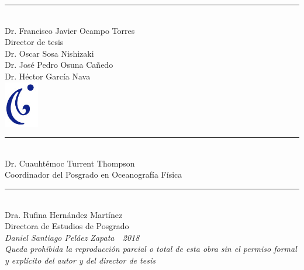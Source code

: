 \documentclass[11pt]{report}
\def\thesisyear{2018}
\def\thesisauthor{Daniel Santiago Peláez Zapata}
\newcommand{\comite}[2]{#1 \\ {\small #2}}
\begin{document}
\begin{titlepage}
\begin{center}
    \rule{0.5\textwidth}{.5pt} \\
    \comite{Dr. Francisco Javier Ocampo Torres}{Director de tesis} \\
    \vfill
    Dr. Oscar Sosa Nishizaki    \\ \vspace{1em}
    Dr. José Pedro Osuna Cañedo \\ \vspace{1em}
    Dr. Héctor García Nava      \\ \vspace{1em}
    \vfill
    \includegraphics[width=1.5cm]{frontmatter/oceanografia.jpg} \\
    \vfill
    \rule{0.5\textwidth}{.5pt} \\
    \comite{Dr. Cuauhtémoc Turrent Thompson}{Coordinador del Posgrado en
    Oceanografía Física} \\ \vspace{1em}
    \vfill
    \rule{0.5\textwidth}{.5pt} \\
    \comite{Dra. Rufina Hernández Martínez}{Directora de Estudios de Posgrado} \\
    \vfill
    \scriptsize{
      \textit{ \thesisauthor~\textcopyright~\thesisyear} \\ \vspace{1em}
      \textit{Queda prohibida la reproducción parcial o total de esta
      obra sin el permiso formal y explícito del autor y del director de tesis}
    }
  \end{center}

\end{titlepage}


\setlength{\parindent}{0mm}

\setcounter{page}{2}

\renewcommand{\contentsname}{Tabla de contenido}
\renewcommand{\listfigurename}{Lista de figuras}
\renewcommand{\listtablename}{Lista de tablas}
\renewcommand{\appendixname}{Anexo}
\renewcommand{\bibname}{Literatura citada}
\renewcommand{\figurename}{Figura}
\renewcommand{\tablename}{Tabla}
\end{document}
